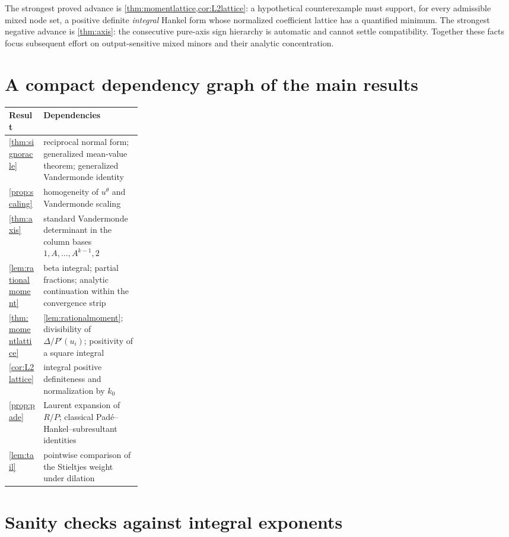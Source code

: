 \documentclass[11pt]{article}
\theoremstyle{definition}
\theoremstyle{remark}
\begin{document}
The strongest proved advance is \cref{thm:momentlattice,cor:L2lattice}: a hypothetical
counterexample must support, for every admissible mixed node set, a positive definite
\emph{integral} Hankel form whose normalized coefficient lattice has a quantified minimum.
The strongest negative advance is \cref{thm:axis}: the consecutive pure-axis sign hierarchy
is automatic and cannot settle compatibility.  Together these facts focus subsequent effort
on output-sensitive mixed minors and their analytic concentration.

\appendix

\section{A compact dependency graph of the main results}

\begin{center}
\begin{tabularx}{0.94\linewidth}{@{}p{0.26\linewidth}X@{}}
\toprule
Result & Dependencies\\
\midrule
\cref{thm:signoracle} & reciprocal normal form; generalized mean-value theorem; generalized Vandermonde identity\\
\cref{prop:scaling} & homogeneity of $u^\theta$ and Vandermonde scaling\\
\cref{thm:axis} & standard Vandermonde determinant in the column bases $1,A,\ldots,A^{k-1},2$\\
\cref{lem:rationalmoment} & beta integral; partial fractions; analytic continuation within the convergence strip\\
\cref{thm:momentlattice} & \cref{lem:rationalmoment}; divisibility of $\Delta/P'(u_i)$; positivity of a square integral\\
\cref{cor:L2lattice} & integral positive definiteness and normalization by $k_0$\\
\cref{prop:pade} & Laurent expansion of $R/P$; classical Pad\'e--Hankel--subresultant identities\\
\cref{lem:tail} & pointwise comparison of the Stieltjes weight under dilation\\
\bottomrule
\end{tabularx}
\end{center}

\section{Sanity checks against integral exponents}
\end{document}
